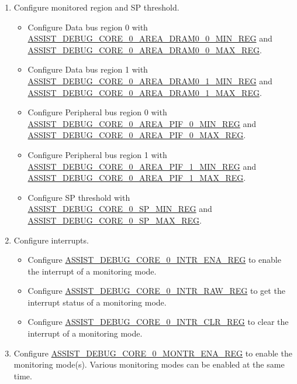 \documentclass[main\_\_EN.tex]{subfiles}
\begin{document}
\begin{enumerate}
    \item Configure monitored region and SP threshold.
        \begin{itemize}
            \item Configure Data bus region 0 with \hyperref[regdesc:ASSISTDEBUGCORE0AREADRAM00MINREG]{ASSIST\_DEBUG\_CORE\_0\_AREA\_DRAM0\_0\_MIN\_REG} and\\ \hyperref[regdesc:ASSISTDEBUGCORE0AREADRAM00MAXREG]{ASSIST\_DEBUG\_CORE\_0\_AREA\_DRAM0\_0\_MAX\_REG}. 
            \item Configure Data bus region 1 with \hyperref[regdesc:ASSISTDEBUGCORE0AREADRAM01MINREG]{ASSIST\_DEBUG\_CORE\_0\_AREA\_DRAM0\_1\_MIN\_REG} and\\ \hyperref[regdesc:ASSISTDEBUGCORE0AREADRAM01MAXREG]{ASSIST\_DEBUG\_CORE\_0\_AREA\_DRAM0\_1\_MAX\_REG}.
            \item Configure Peripheral bus region 0 with \hyperref[regdesc:ASSISTDEBUGCORE0AREAPIF0MINREG]{ASSIST\_DEBUG\_CORE\_0\_AREA\_PIF\_0\_MIN\_REG} and\\ \hyperref[regdesc:ASSISTDEBUGCORE0AREAPIF0MAXREG]{ASSIST\_DEBUG\_CORE\_0\_AREA\_PIF\_0\_MAX\_REG}.
            \item Configure Peripheral bus region 1 with \hyperref[regdesc:ASSISTDEBUGCORE0AREAPIF1MINREG]{ASSIST\_DEBUG\_CORE\_0\_AREA\_PIF\_1\_MIN\_REG} and\\ \hyperref[regdesc:ASSISTDEBUGCORE0AREAPIF1MAXREG]{ASSIST\_DEBUG\_CORE\_0\_AREA\_PIF\_1\_MAX\_REG}.
            \item Configure SP threshold with \hyperref[regdesc:ASSISTDEBUGCORE0SPMINREG]{ASSIST\_DEBUG\_CORE\_0\_SP\_MIN\_REG} and\\ \hyperref[regdesc:ASSISTDEBUGCORE0SPMAXREG]{ASSIST\_DEBUG\_CORE\_0\_SP\_MAX\_REG}.
        \end{itemize}
    
    \item Configure interrupts.
    \begin{itemize}
        \item Configure \hyperref[regdesc:ASSISTDEBUGCORE0INTRENAREG]{ASSIST\_DEBUG\_CORE\_0\_INTR\_ENA\_REG} to enable the interrupt of a monitoring mode. 
        \item Configure \hyperref[regdesc:ASSISTDEBUGCORE0INTRRAWREG]{ASSIST\_DEBUG\_CORE\_0\_INTR\_RAW\_REG} to get the interrupt status of a monitoring mode. 
        \item Configure \hyperref[regdesc:ASSISTDEBUGCORE0INTRCLRREG]{ASSIST\_DEBUG\_CORE\_0\_INTR\_CLR\_REG} to clear the interrupt of a monitoring mode.
    \end{itemize}
    \item Configure \hyperref[regdesc:ASSISTDEBUGCORE0MONTRENAREG]{ASSIST\_DEBUG\_CORE\_0\_MONTR\_ENA\_REG} to enable the monitoring mode(s). Various monitoring modes can be enabled at the same time.
\end{enumerate}
\end{document}
